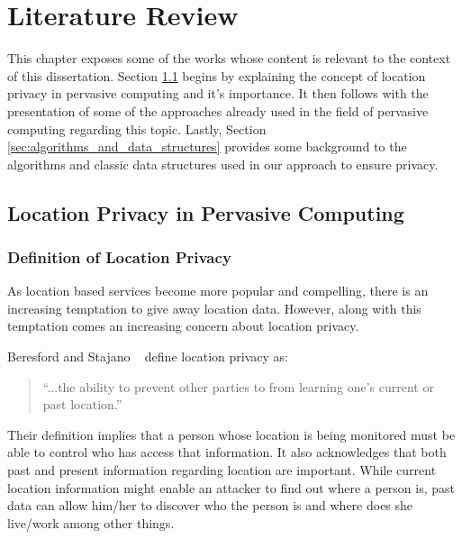 \chapter{Literature Review}
\label{chap:literature_review}

This chapter exposes some of the works whose content is relevant to
the context of this dissertation. Section
\ref{sec:privacy_pervasive_computing} begins by explaining the concept
of location privacy in pervasive computing and it's importance. It then follows
with the presentation of some of the approaches already used in the 
field of pervasive computing regarding this topic. Lastly, Section
\ref{sec:algorithms_and_data_structures} provides some background to
the algorithms and classic data structures used in our approach to ensure
privacy.
\section{Location Privacy in Pervasive Computing}
\label{sec:privacy_pervasive_computing}

\subsection{Definition of Location Privacy}
\label{sec:definition_privacy}
As location based services become more popular and compelling, there
is an increasing temptation to give away location data. However, along
with this temptation comes an increasing concern about location
privacy.

Beresford and Stajano ~\cite{1186725} define location privacy as:
\begin{quotation}
  ``...the ability to prevent other parties to from learning one's
  current or past location.''
\end{quotation}
Their definition implies that a person whose location is being
monitored must be able to control who has access that information.
It also acknowledges that both past and present information regarding location
are important. While current location information might enable an
attacker to find out where a person is, past data can allow him/her to
discover who the person is and where does she live/work among other
things.

